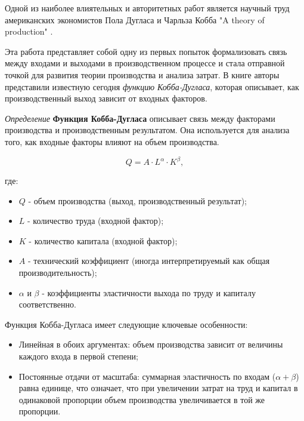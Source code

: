 Одной из наиболее влиятельных и авторитетных работ является научный труд американских экономистов Пола Дугласа и Чарльза Кобба  
"A theory of production" \cite{cobb1928theory}.

Эта работа представляет собой одну из первых попыток формализовать связь между входами и выходами в производственном процессе и стала отправной точкой для развития теории производства и анализа затрат. В книге авторы представили известную сегодня \textit{функцию Кобба-Дугласа}, которая описывает, как производственный выход зависит от входных факторов.

\textit{Определение} \textbf{Функция Кобба-Дугласа}  описывает связь между факторами производства и производственным результатом. Она используется для анализа того, как входные факторы влияют на объем производства.

\[ Q = A \cdot L^\alpha \cdot K^\beta, \]

где:\begin{itemize}
    \item \( Q \) - объем производства (выход, производственный результат);
    \item  \( L \) - количество труда (входной фактор);
    \item \( K \) - количество капитала (входной фактор);
    \item \( A \) - технический коэффициент (иногда интерпретируемый как общая производительность);
    \item \( \alpha \) и \( \beta \) - коэффициенты эластичности выхода по труду и капиталу соответственно.
\end{itemize}

Функция Кобба-Дугласа имеет следующие ключевые особенности:
\begin{itemize}
    \item Линейная в обоих аргументах: объем производства зависит от величины каждого входа в первой степени;
    \item Постоянные отдачи от масштаба: суммарная эластичность по входам (\( \alpha + \beta \)) равна единице, что означает, что при увеличении затрат на труд и капитал в одинаковой пропорции объем производства увеличивается в той же пропорции.
\end{itemize}
